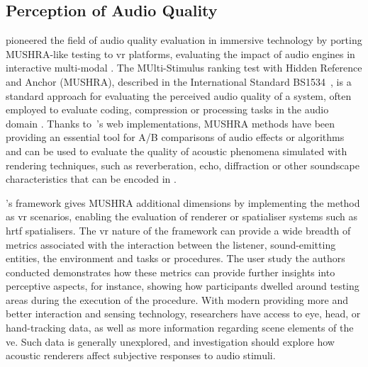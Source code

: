 


\subsection{Perception of Audio Quality}
\cite{rummukainen2018audio} pioneered the field of audio quality evaluation in immersive technology by porting MUSHRA-like testing to \acrshort{vr} platforms, evaluating the impact of audio engines in interactive multi-modal . The MUlti-Stimulus ranking test with Hidden Reference and Anchor (MUSHRA), described in the International Standard BS1534~\citep{liebetrau2014revision}, is a standard approach for evaluating the perceived audio quality of a system, often employed to evaluate coding, compression or processing tasks in the audio domain \citep{series2014method}. Thanks to~\cite{waet2015}'s web implementations, MUSHRA methods have been providing an essential tool for A/B comparisons of audio effects or algorithms and can be used to evaluate the quality of acoustic phenomena simulated with rendering techniques, such as reverberation, echo, diffraction or other soundscape characteristics that can be encoded in .\par
\cite{rummukainen2018audio}'s framework gives MUSHRA additional dimensions by implementing the method as \acrshort{vr} scenarios, enabling the evaluation of renderer or spatialiser systems such as \acrshort{hrtf} spatialisers. The \acrshort{vr} nature of the framework can provide a wide breadth of metrics associated with the interaction between the listener, sound-emitting entities, the environment and tasks or procedures. The user study the authors conducted demonstrates how these metrics can provide further insights into perceptive aspects, for instance, showing how participants dwelled around testing areas during the execution of the procedure. With modern  providing more and better interaction and sensing technology, researchers have access to eye, head, or hand-tracking data, as well as more information regarding scene elements of the \acrshort{ve}. Such data is generally unexplored, and investigation should explore how acoustic renderers affect subjective responses to audio stimuli.\par

